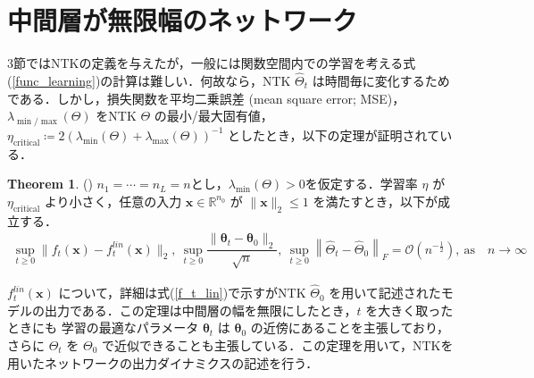 \documentclass[a4paper]{bxjsarticle}
\theoremstyle{definition}
\newtheorem{thm}{Theorem}[section]
\begin{document}
\section{中間層が無限幅のネットワーク}
\label{infinite_width}
3節ではNTKの定義を与えたが，一般には関数空間内での学習を考える式(\ref{func_learning})の計算は難しい．何故なら，NTK $\hat{\Theta}_t$ は時間毎に変化するためである．しかし，損失関数を平均二乗誤差 (mean square error; MSE)，$\lambda_{\min/\max}(\Theta)$ をNTK $\Theta$ の最小/最大固有値，$\eta_{\text{critical}} \coloneqq 2(\lambda_{\min}(\Theta)+\lambda_{\max}(\Theta))^{-1}$ としたとき，以下の定理が証明されている．\vspace{0.5em}

\begin{thm}
\label{statement_ntk}
    (\citealp{lee2019wide}) $n_1 = \cdots = n_L = n$とし，$\lambda_{\min}(\Theta) > 0$を仮定する．学習率 $\eta$ が $\eta_{\text{critical}}$ より小さく，任意の入力 $\bm{x} \in \mathbb{R}^{n_0}$ が $\|\bm{x}\|_2 \leq 1$ を満たすとき，以下が成立する．
    \begin{align*}
        \sup_{t \geq 0} \|f_t(\bm{x}) - f_t^{lin}(\bm{x})\|_2, \ \sup_{t \geq 0} \dfrac{\|\bm{\theta}_t - \bm{\theta}_0\|_2}{\sqrt{n}}, \ \sup_{t \geq 0}\left\|\hat{\Theta}_t - \hat{\Theta}_0\right\|_F = \mathcal{O}\left(n^{-\frac{1}{2}}\right), \ \mbox{as} \quad n \rightarrow \infty
    \end{align*}
\end{thm}
\par
\noindent
$f_t^{lin}(\bm{x})$ について，詳細は式(\ref{f_t_lin})で示すがNTK $\hat{\Theta}_0$ を用いて記述されたモデルの出力である．この定理は中間層の幅を無限にしたとき，$t$ を大きく取ったときにも 学習の最適なパラメータ $\bm{\theta}_t$ は $\bm{\theta}_0$ の近傍にあることを主張しており，さらに $\Theta_t$ を $\Theta_0$ で近似できることも主張している．この定理を用いて，NTKを用いたネットワークの出力ダイナミクスの記述を行う．
\end{document}

